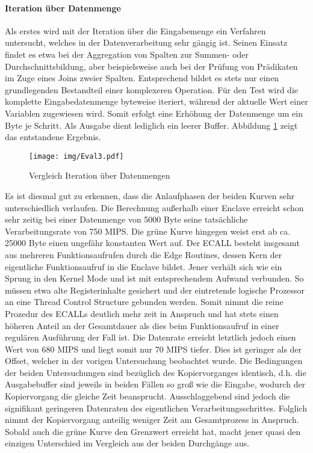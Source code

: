 \paragraph{Iteration über Datenmenge}

Als erstes wird mit der Iteration über die Eingabemenge ein Verfahren untersucht, welches in der Datenverarbeitung sehr gängig ist. Seinen Einsatz findet es etwa bei der Aggregation von Spalten zur Summen- oder Durchschnittsbildung, aber beispielsweise auch bei der Prüfung von Prädikaten im Zuge eines Joins zweier Spalten. Entsprechend bildet es stets nur einen grundlegenden Bestandteil einer komplexeren Operation. Für den Test wird die komplette Eingabedatenmenge byteweise iteriert, während der aktuelle Wert einer Variablen zugewiesen wird. Somit erfolgt eine Erhöhung der Datenmenge um ein Byte je Schritt. Als Ausgabe dient lediglich ein leerer Buffer. Abbildung \ref{fig:eval3} zeigt das entstandene Ergebnis.

\begin{figure}[h]
	\texttt{[image: img/Eval3.pdf]}
	\centering
	\caption{Vergleich Iteration über Datenmengen}
	\label{fig:eval3}
\end{figure}

Es ist diesmal gut zu erkennen, dass die Anlaufphasen der beiden Kurven sehr unterschiedlich verlaufen. Die Berechnung außerhalb einer Enclave erreicht schon sehr zeitig bei einer Datenmenge von 5000 Byte seine tatsächliche Verarbeitungsrate von 750 MIPS. Die grüne Kurve hingegen weist erst ab ca. 25000 Byte einen ungefähr konstanten Wert auf. Der ECALL besteht insgesamt aus mehreren Funktionsaufrufen durch die Edge Routines, dessen Kern der eigentliche Funktionsaufruf in die Enclave bildet. Jener verhält sich wie ein Sprung in den Kernel Mode und ist mit entsprechendem Aufwand verbunden. So müssen etwa alte Registerinhalte gesichert und der eintretende logische Prozessor an eine Thread Control Structure gebunden werden. Somit nimmt die reine Prozedur des ECALLs deutlich mehr zeit in Anspruch und hat stets einen höheren Anteil an der Gesamtdauer als dies beim Funktionsaufruf in einer regulären Ausführung der Fall ist. Die Datenrate erreicht letztlich jedoch einen Wert von 680 MIPS und liegt somit nur 70 MIPS tiefer. Dies ist geringer als der Offset, welcher in der vorigen Untersuchung beobachtet wurde. Die Bedingungen der beiden Untersuchungen sind bezüglich des Kopiervorganges identisch, d.h. die Ausgabebuffer sind jeweils in beiden Fällen so groß wie die Eingabe, wodurch der Kopiervorgang die gleiche Zeit beansprucht. Ausschlaggebend sind jedoch die signifikant geringeren Datenraten des eigentlichen Verarbeitungsschrittes. Folglich nimmt der Kopiervorgang anteilig weniger Zeit am Gesamtprozess in Anspruch. Sobald auch die grüne Kurve den Grenzwert erreicht hat, macht jener quasi den einzigen Unterschied im Vergleich aus der beiden Durchgänge aus.


